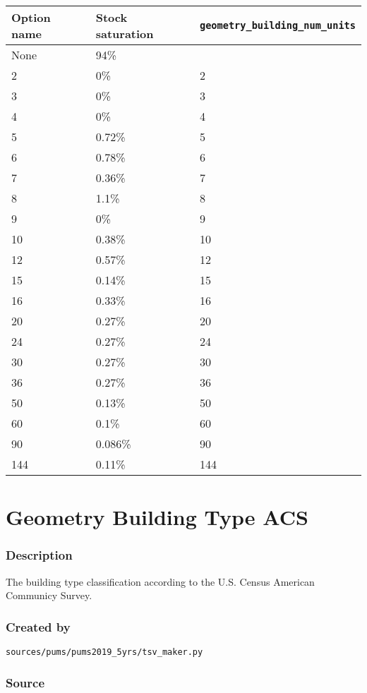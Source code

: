 \begin{longtable}[]{@{}lll@{}}
\toprule\noalign{}
Option name & Stock saturation &
\texttt{geometry\_building\_num\_units} \\
\midrule\noalign{}
\endhead
\bottomrule\noalign{}
\endlastfoot
None & 94\% & \\
2 & 0\% & 2 \\
3 & 0\% & 3 \\
4 & 0\% & 4 \\
5 & 0.72\% & 5 \\
6 & 0.78\% & 6 \\
7 & 0.36\% & 7 \\
8 & 1.1\% & 8 \\
9 & 0\% & 9 \\
10 & 0.38\% & 10 \\
12 & 0.57\% & 12 \\
15 & 0.14\% & 15 \\
16 & 0.33\% & 16 \\
20 & 0.27\% & 20 \\
24 & 0.27\% & 24 \\
30 & 0.27\% & 30 \\
36 & 0.27\% & 36 \\
50 & 0.13\% & 50 \\
60 & 0.1\% & 60 \\
90 & 0.086\% & 90 \\
144 & 0.11\% & 144 \\
\end{longtable}

\section{Geometry Building Type
ACS}\label{geometry_building_type_acs}

\subsubsection{Description}\label{description-49}

The building type classification according to the U.S. Census American
Communicy Survey.

\subsubsection{Created by}\label{created-by-49}

\texttt{sources/pums/pums2019\_5yrs/tsv\_maker.py}

\subsubsection{Source}\label{source-48}

